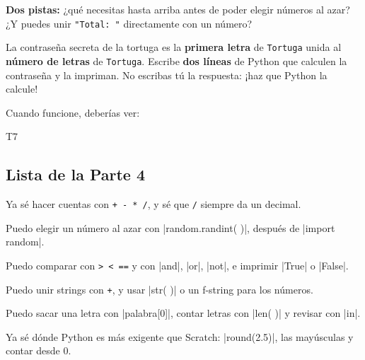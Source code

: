 \textbf{Dos pistas:} ¿qué necesitas hasta arriba antes de poder elegir números al azar? ¿Y puedes unir \texttt{"Total: "} directamente con un número?

\begin{puzzle}
La contraseña secreta de la tortuga es la \textbf{primera letra} de \texttt{Tortuga} unida al \textbf{número de letras} de \texttt{Tortuga}. Escribe \textbf{dos líneas} de Python que calculen la contraseña y la impriman. No escribas tú la respuesta: ¡haz que Python la calcule!

Cuando funcione, deberías ver:
\begin{outputbox}
T7
\end{outputbox}
\end{puzzle}

\subsection*{Lista de la Parte 4}
\tick Ya sé hacer cuentas con \texttt{+ - * /}, y sé que \texttt{/} siempre da un decimal.\par
\tick Puedo elegir un número al azar con \py|random.randint( )|, después de \py|import random|.\par
\tick Puedo comparar con \texttt{> < ==} y con \py|and|, \py|or|, \py|not|, e imprimir \py|True| o \py|False|.\par
\tick Puedo unir strings con \texttt{+}, y usar \py|str( )| o un f-string para los números.\par
\tick Puedo sacar una letra con \py|palabra[0]|, contar letras con \py|len( )| y revisar con \py|in|.\par
\tick Ya sé dónde Python es más exigente que Scratch: \py|round(2.5)|, las mayúsculas y contar desde 0.
